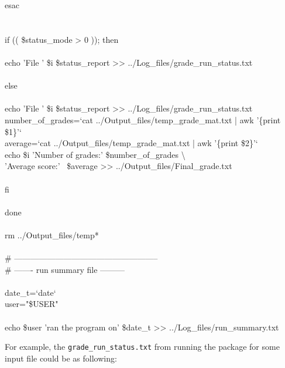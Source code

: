 \begin{mdframed}[hidealllines=true,backgroundcolor=gray!20]
\begin{singlespace}
{{\color{for_pink}esac}\\
\\
\\
{\color{for_pink}if} (( \$status\_mode > 0 )); {\color{for_pink}then}\\
\\
echo {\color{red}'File '} \$i \$status\_report >>  ../Log\_files/grade\_run\_status.txt\\
\\
{\color{for_pink}else}\\
\\
echo {\color{red}'File '} \$i \$status\_report >>  ../Log\_files/grade\_run\_status.txt\\
number\_of\_grades={\color{red}`cat ../Output\_files/temp\_grade\_mat.txt | awk '\{print \$1\}'`}\\
average={\color{red}`cat ../Output\_files/temp\_grade\_mat.txt | awk '\{print \$2\}'`}\\
echo \$i {\color{red}'Number of grades:'}  \$number\_of\_grades \textbackslash \\
\phantom{x}\hspace{14ex} {\color{red}'Average score:'} \  \$average >> ../Output\_files/Final\_grade.txt \\
\\
{\color{for_pink}fi}\\
\\
{\color{for_pink}done}\\
\\
rm ../Output\_files/temp*  \\  
\\
{ \color{matlab_green} \# -----------------------------------------------------}\\
{ \color{matlab_green} \# ------- run summary file ---------}\\
\\
date\_t={\color{red}`date`}\\
user={\color{red}"\$USER"}\\
\\
echo  \$user {\color{red}'ran the program on'}  \$date\_t  >> ../Log\_files/run\_summary.txt\\
 }
\end{singlespace}
\end{mdframed}
\vspace{5mm}
\noindent
For example, the \texttt{grade\_run\_status.txt}  from running the package for some input file could be as following:\\

